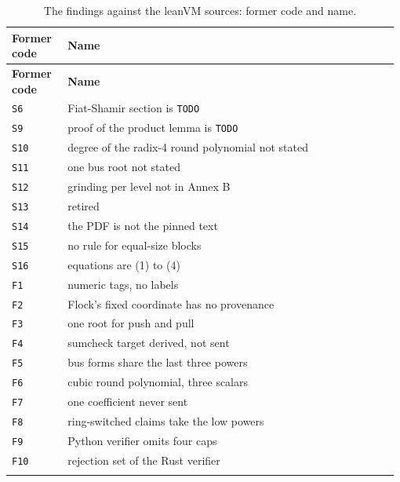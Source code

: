 {\footnotesize\setlength{\tabcolsep}{3pt}
\begin{longtable}{@{}>{\raggedright\arraybackslash}p{0.147\linewidth}>{\raggedright\arraybackslash}p{0.835\linewidth}@{}}
\caption{The findings against the leanVM sources: former code and name.}\label{tab:docs-map-sources}\\
\toprule
\textbf{Former code} & \textbf{Name} \\
\midrule
\endfirsthead
\toprule
\textbf{Former code} & \textbf{Name} \\
\midrule
\endhead
\bottomrule
\endfoot
\texttt{S6} & Fiat-Shamir section is \texttt{TODO} \\\addlinespace[2pt]
\texttt{S9} & proof of the product lemma is \texttt{TODO} \\\addlinespace[2pt]
\texttt{S10} & degree of the radix-4 round polynomial not stated \\\addlinespace[2pt]
\texttt{S11} & one bus root not stated \\\addlinespace[2pt]
\texttt{S12} & grinding per level not in Annex B \\\addlinespace[2pt]
\texttt{S13} & retired \\\addlinespace[2pt]
\texttt{S14} & the PDF is not the pinned text \\\addlinespace[2pt]
\texttt{S15} & no rule for equal-size blocks \\\addlinespace[2pt]
\texttt{S16} & equations are (1) to (4) \\\addlinespace[2pt]
\texttt{F1} & numeric tags, no labels \\\addlinespace[2pt]
\texttt{F2} & Flock's fixed coordinate has no provenance \\\addlinespace[2pt]
\texttt{F3} & one root for push and pull \\\addlinespace[2pt]
\texttt{F4} & sumcheck target derived, not sent \\\addlinespace[2pt]
\texttt{F5} & bus forms share the last three powers \\\addlinespace[2pt]
\texttt{F6} & cubic round polynomial, three scalars \\\addlinespace[2pt]
\texttt{F7} & one coefficient never sent \\\addlinespace[2pt]
\texttt{F8} & ring-switched claims take the low powers \\\addlinespace[2pt]
\texttt{F9} & Python verifier omits four caps \\\addlinespace[2pt]
\texttt{F10} & rejection set of the Rust verifier \\\addlinespace[2pt]

\end{longtable}}
